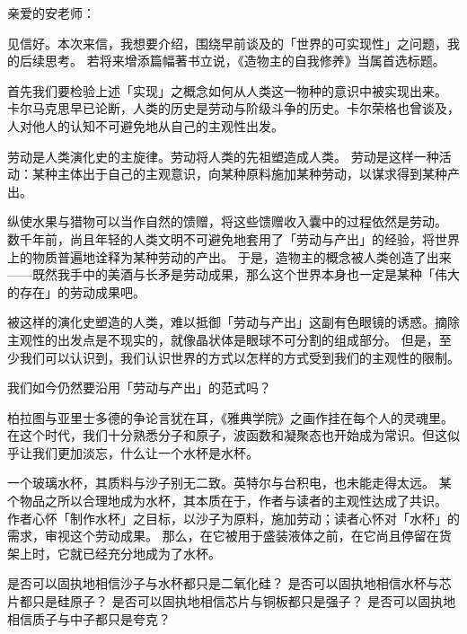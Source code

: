 \documentclass[a4paper,11pt]{article}
\begin{document}
\rmfamily\frenchspacing
\chineseindenting

\noindent
亲爱的安老师：
\vspace{1em}

见信好。本次来信，我想要介绍，围绕早前谈及的「世界的可实现性」之问题，我的后续思考。
若将来增添篇幅著书立说，《造物主的自我修养》当属首选标题。






首先我们要检验上述「实现」之概念如何从人类这一物种的意识中被实现出来。
卡尔马克思早已论断，人类的历史是劳动与阶级斗争的历史。卡尔荣格也曾谈及，人对他人的认知不可避免地从自己的主观性出发。

劳动是人类演化史的主旋律。劳动将人类的先祖塑造成人类。
劳动是这样一种活动：某种主体出于自己的主观意识，向某种原料施加某种劳动，以谋求得到某种产出。

纵使水果与猎物可以当作自然的馈赠，将这些馈赠收入囊中的过程依然是劳动。
数千年前，尚且年轻的人类文明不可避免地套用了「劳动与产出」的经验，将世界上的物质普遍地诠释为某种劳动的产出。
于是，造物主的概念被人类创造了出来——既然我手中的美酒与长矛是劳动成果，那么这个世界本身也一定是某种「伟大的存在」的劳动成果吧。

被这样的演化史塑造的人类，难以抵御「劳动与产出」这副有色眼镜的诱惑。摘除主观性的出发点是不现实的，就像晶状体是眼球不可分割的组成部分。
但是，至少我们可以认识到，我们认识世界的方式以怎样的方式受到我们的主观性的限制。

我们如今仍然要沿用「劳动与产出」的范式吗？








柏拉图与亚里士多德的争论言犹在耳，《雅典学院》之画作挂在每个人的灵魂里。
在这个时代，我们十分熟悉分子和原子，波函数和凝聚态也开始成为常识。但这似乎让我们更加淡忘，什么让一个水杯是水杯。

一个玻璃水杯，其质料与沙子别无二致。英特尔与台积电，也未能走得太远。
某个物品之所以合理地成为水杯，其本质在于，作者与读者的主观性达成了共识。
作者心怀「制作水杯」之目标，以沙子为原料，施加劳动；读者心怀对「水杯」的需求，审视这个劳动成果。
那么，在它被用于盛装液体之前，在它尚且停留在货架上时，它就已经充分地成为了水杯。

是否可以固执地相信沙子与水杯都只是二氧化硅？
是否可以固执地相信水杯与芯片都只是硅原子？
是否可以固执地相信芯片与铜板都只是强子？
是否可以固执地相信质子与中子都只是夸克？
\end{document}
